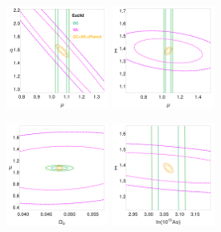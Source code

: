 \begin{figure}[htbp]
\begin{centering}
\includegraphics[width=0.3\textwidth]{Chapters/linear-nonlinear-MG-forecasts/figures/ellipses/DE-related/ellipsesPlot-withLegendManual-MuEtaFisher-Marged-fiducialMGDE2nonuhs-GC_WL_GC+WL+Planck--nlHS-pars-6-7_-.pdf}
\includegraphics[width=0.3\textwidth]{Chapters/linear-nonlinear-MG-forecasts/figures/ellipses/DE-related/ellipsesPlot-noLegendManual-MuSigmaFisher-Marged-fiducialMGDE2nonuhs-GC_WL_GC+WL+Planck--nlHS-pars-6-7_-.pdf} \\
\end{centering}
\begin{centering}
\includegraphics[width=0.3\textwidth]{Chapters/linear-nonlinear-MG-forecasts/figures/ellipses/DE-related/ellipsesPlot-noLegendManual-MuSigmaFisher-Marged-fiducialMGDE2nonuhs-GC_WL_GC+WL+Planck--nlHS-pars-2-6_-.pdf}
\includegraphics[width=0.3\textwidth]{Chapters/linear-nonlinear-MG-forecasts/figures/ellipses/DE-related/ellipsesPlot-noLegendManual-MuSigmaFisher-Marged-fiducialMGDE2nonuhs-GC_WL_GC+WL+Planck--nlHS-pars-4-7_-.pdf} 

\end{centering}
\end{figure}
